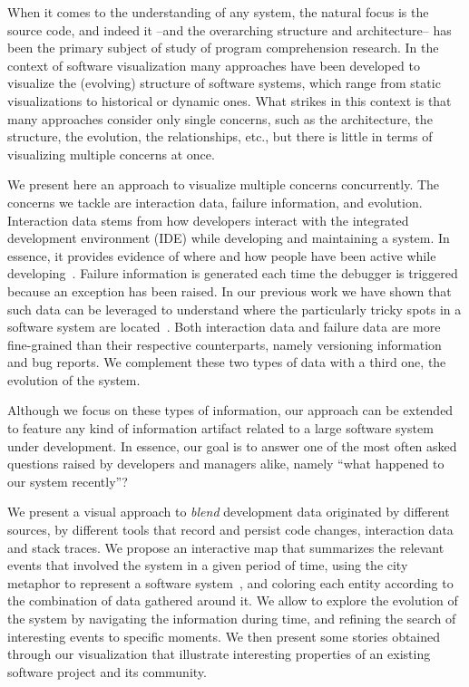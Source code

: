 When it comes to the understanding of any system, the natural focus is the source code, and indeed it --and the overarching structure and architecture-- has been the primary subject of study of program comprehension research.
In the context of software visualization many approaches have been developed to visualize the (evolving) structure of software systems, which range from static visualizations to historical or dynamic ones.
What strikes in this context is that many approaches consider only single concerns, such as the architecture, the structure, the evolution, the relationships, etc., but there is little in terms of visualizing multiple concerns at once.

We present here an approach to visualize multiple concerns concurrently.
The concerns we tackle are interaction data, failure information, and evolution.
Interaction data stems from how developers interact with the integrated development environment (IDE) while developing and maintaining a system.
In essence, it provides evidence of where and how people have been active while developing~\cite{Mine2015b}.
Failure information is generated each time the debugger is triggered because an exception has been raised.
In our previous work we have shown that such data can be leveraged to understand where the particularly tricky spots in a software system are located~\cite{DalS2015a}.
Both interaction data and failure data are more fine-grained than their respective counterparts, namely versioning information and bug reports.
We complement these two types of data with a third one, the evolution of the system.

Although we focus on these types of information, our approach can be extended to feature any kind of information artifact related to a large software system under development.
In essence, our goal is to answer one of the most often asked questions raised by developers and managers alike, namely ``what happened to our system recently''?~\cite{Sill2008}

We present a visual approach to \emph{blend} development data originated by different  sources, \eg by different tools that record and persist code changes, interaction data and stack traces.
We propose an interactive map that summarizes the relevant events that involved the system in a given period of time, using the city metaphor to represent a software system~\cite{Wett2007}, and coloring each entity according to the combination of data gathered around it.
We allow to explore the evolution of the system by navigating the information during time, and refining the search of interesting events to specific moments.
We then present some stories obtained through our visualization that illustrate interesting properties of an existing software project and its community.

